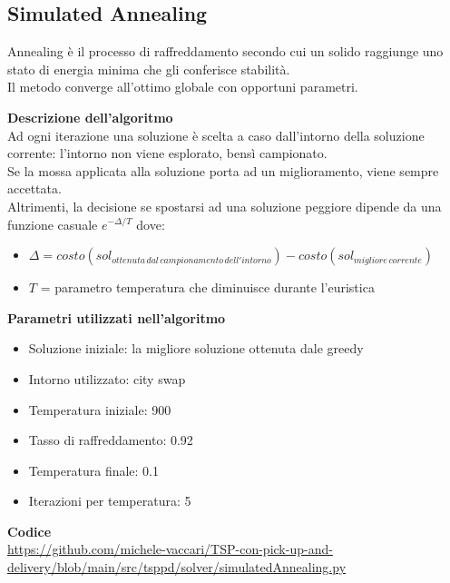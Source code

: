 \documentclass[9pt]{beamer}
\begin{document}
\subsection{Simulated Annealing}
\begin{frame}{\subsecname}

	Annealing è il processo di raffreddamento secondo cui un solido raggiunge uno stato di energia minima che gli conferisce stabilità. \\
	Il metodo converge all’ottimo globale con opportuni parametri.

	\textbf{Descrizione dell'algoritmo} \\
	Ad ogni iterazione una soluzione è scelta a caso dall’intorno della soluzione corrente: l’intorno non viene esplorato, bensì campionato. \\
	Se la mossa applicata alla soluzione porta ad un miglioramento, viene sempre accettata. \\
	Altrimenti, la decisione se spostarsi ad una soluzione peggiore dipende da una funzione casuale $e^{-\Delta / T}$ dove:
	\begin{itemize}
		\item
		$\Delta = costo(sol_{ottenuta\,dal\,campionamento\,dell'intorno}) - costo(sol_{migliore\,corrente})$
		\item
		$T$ = parametro temperatura che diminuisce durante l'euristica
	\end{itemize}

\framebreak

	\textbf{Parametri utilizzati nell'algoritmo}
	\begin{itemize}
		\item
		Soluzione iniziale: la migliore soluzione ottenuta dale greedy
		\item
		Intorno utilizzato: city swap
		\item
		Temperatura iniziale: 900
		\item
		Tasso di raffreddamento: 0.92
		\item
		Temperatura finale: 0.1
		\item
		Iterazioni per temperatura: 5
	\end{itemize}

	\textbf{Codice} \\
	\href{https://github.com/michele-vaccari/TSP-con-pick-up-and-delivery/blob/main/src/tsppd/solver/simulatedAnnealing.py}{https://github.com/michele-vaccari/TSP-con-pick-up-and-delivery/blob/main/src/tsppd/solver/simulatedAnnealing.py}


\end{frame}
\end{document}
